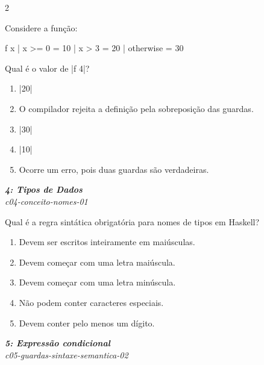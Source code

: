 \documentclass[a4paper,10pt,brazil]{article}
\begin{document}
\begin{multicols}{2}
\begin{flushright}
\end{flushright}
Considere a função:
\begin{haskellcode}
f x
  | x >= 0    = 10
  | x > 3     = 20
  | otherwise = 30
\end{haskellcode}
Qual é o valor de \haskellinline|f 4|?

\begin{enumerate}
  \item \haskellinline|20|

  \item O compilador rejeita a definição pela sobreposição das guardas.

  \item \haskellinline|30|

  \item \haskellinline|10|

  \item Ocorre um erro, pois duas guardas são verdadeiras.


\end{enumerate}

\begin{flushright}
  \footnotesize
  \textit{\textbf{4: Tipos de Dados}}\\
  \textit{c04-conceito-nomes-01}\\

\end{flushright}
Qual é a regra sintática obrigatória para nomes de tipos em Haskell?

\begin{enumerate}
  \item Devem ser escritos inteiramente em maiúsculas.

  \item Devem começar com uma letra maiúscula.

  \item Devem começar com uma letra minúscula.

  \item Não podem conter caracteres especiais.

  \item Devem conter pelo menos um dígito.


\end{enumerate}

\begin{flushright}
  \footnotesize
  \textit{\textbf{5: Expressão condicional}}\\
  \textit{c05-guardas-sintaxe-semantica-02}\\


\end{flushright}
\end{multicols}
\end{document}
